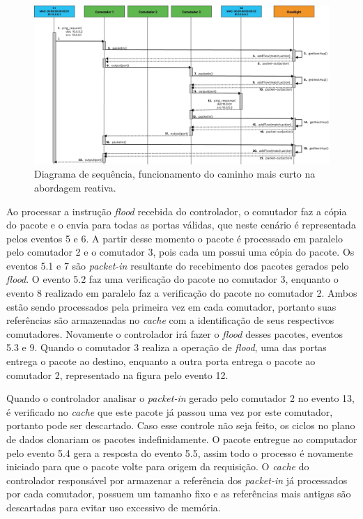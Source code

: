 \begin{figure}[htb!]
	\caption{\label{fig:rf2} Diagrama de sequência, funcionamento do caminho mais curto na abordagem reativa.} 
	\begin{center}
	    \includegraphics[scale=0.43]{imagens/rf.2.jpg}
	\end{center}
\end{figure}
Ao processar a instrução \emph{flood} recebida do controlador, o comutador faz a cópia do pacote e o envia para todas as portas válidas, que neste cenário é representada pelos eventos 5 e 6. A partir desse momento o pacote é processado em paralelo pelo comutador 2 e o comutador 3, pois cada um possui uma cópia do pacote.  Os eventos 5.1 e 7 são \emph{packet-in} resultante do recebimento dos pacotes gerados pelo \emph{flood}. O evento 5.2 faz uma verificação do pacote no comutador 3, enquanto o evento 8 realizado em paralelo faz a verificação do pacote no comutador 2. Ambos estão sendo processados pela primeira vez em cada comutador, portanto suas referências são armazenadas no \textit{cache} com a identificação de seus respectivos comutadores. Novamente o controlador irá fazer o \emph{flood} desses pacotes, eventos 5.3 e 9. Quando o comutador 3 realiza a operação de \emph{flood}, uma das portas entrega o pacote ao destino, enquanto a outra porta entrega o pacote ao comutador 2, representado na figura pelo evento 12. 

Quando o controlador analisar o \emph{packet-in} gerado pelo comutador 2 no evento 13, é verificado no \textit{cache} que este pacote já passou uma vez por este comutador, portanto pode ser descartado. Caso esse controle não seja feito, os ciclos no plano de dados clonariam os pacotes indefinidamente. O pacote entregue ao computador pelo evento 5.4 gera a resposta do evento 5.5, assim todo o processo é novamente iniciado para que o pacote volte para origem da requisição. O \textit{cache} do controlador responsável por armazenar a referência dos \textit{packet-in} já processados por cada comutador, possuem um tamanho fixo e as referências mais antigas são descartadas para evitar uso excessivo de memória. 


